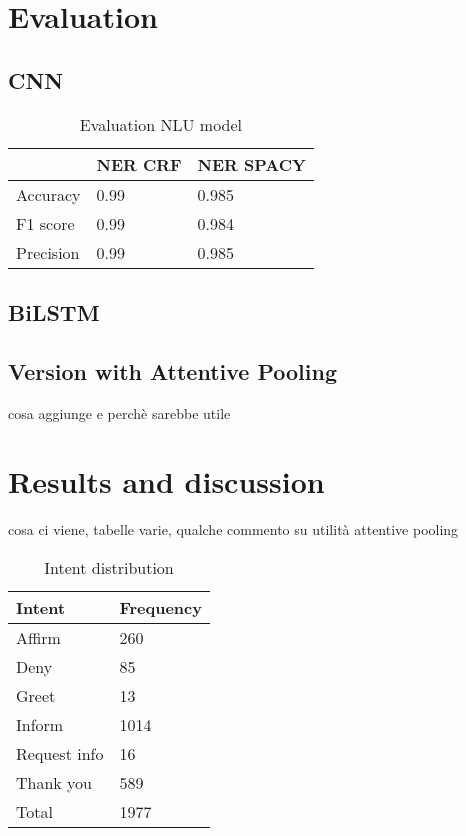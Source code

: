 \documentclass[11pt,a4paper]{article}
\begin{document}
\section{Evaluation}

\subsection{CNN}

\begin{table}[t!]
\begin{center}
\begin{tabular}{|l|l|l|}
\hline \bf & \bf NER CRF & \bf NER SPACY \\ \hline
Accuracy & 0.99 & 0.985 \\
F1 score & 0.99 & 0.984 \\
Precision & 0.99 & 0.985 \\
\hline
\end{tabular}
\end{center}
\caption{\label{font-table} Evaluation NLU model }
\end{table}

\subsection{BiLSTM}

\subsection{Version with Attentive Pooling}
cosa aggiunge e perchè sarebbe utile


\section{Results and discussion}
cosa ci viene, tabelle varie, qualche commento su utilità attentive pooling

\begin{table}[t!]
\begin{center}
\begin{tabular}{|l|l|}
\hline \bf Intent & \bf Frequency \\ \hline
Affirm & 260 \\
Deny & 85 \\
Greet & 13 \\
Inform & 1014 \\
Request info & 16 \\
Thank you & 589 \\
Total & 1977 \\
\hline
\end{tabular}
\end{center}
\caption{\label{font-table} Intent distribution }
\end{table}
\end{document}
